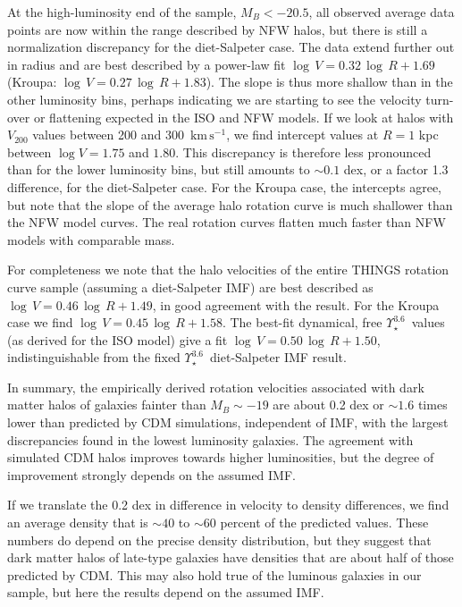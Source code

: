\documentclass[usenatbib,usegraphicx,apjfonts,floatfix]{emulateapj}
\newcommand{\kms}{\ensuremath{\,\mbox{km}\,\mbox{s}^{-1}}}
\newcommand{\Ups}{\ensuremath{\Upsilon_{\star}^{3.6}}}
\begin{document}
At the high-luminosity end of the sample, $M_B < -20.5$, all observed
average data points are now within the range described by NFW halos,
but there is still a normalization discrepancy for the diet-Salpeter
case. The data extend further out in radius and are best described by
a power-law fit $\log\,V = 0.32\, \log\,R + 1.69$ (Kroupa: $\log\,V =
0.27\, \log\,R + 1.83$). The slope is thus more shallow than in the
other luminosity bins, perhaps indicating we are starting to see the
velocity turn-over or flattening expected in the ISO and NFW models.
If we look at halos with $V_{200}$ values between 200 and 300 \kms, we
find intercept values at $R=1$ kpc between $\log V = 1.75$ and
$1.80$. This discrepancy is therefore less pronounced than for the
lower luminosity bins, but still amounts to $\sim 0.1$ dex, or a
factor 1.3 difference, for the diet-Salpeter case.  For the Kroupa
case, the intercepts agree, but note that the slope of the average
halo rotation curve is much shallower than the NFW model curves. The
real rotation curves flatten much faster than NFW models with
comparable mass.

For completeness we note that the halo velocities of the entire THINGS
rotation curve sample (assuming a diet-Salpeter IMF) are best
described as $\log\,V = 0.46\, \log\,R + 1.49$, in good agreement with
the \citet{stacy07} result.  For the Kroupa case we find $\log\,V =
0.45\, \log\,R + 1.58$.  The best-fit dynamical, free \Ups\ values (as
derived for the ISO model) give a fit $\log\,V = 0.50\, \log\,R +
1.50$, indistinguishable from the fixed \Ups\ diet-Salpeter IMF
result.

In summary, the empirically derived rotation velocities associated
with dark matter halos of galaxies fainter than $M_B \sim -19$ are
about 0.2 dex or $\sim 1.6$ times lower than predicted by CDM
simulations, independent of IMF, with the largest discrepancies found
in the lowest luminosity galaxies. The agreement with simulated CDM
halos improves towards higher luminosities, but the degree of
improvement strongly depends on the assumed IMF.

If we translate the 0.2 dex in difference in velocity to density
differences, we find an average density that is $\sim 40$ to $\sim 60$
percent of the predicted values. These numbers do depend on the
precise density distribution, but they suggest that dark matter halos
of late-type galaxies have densities that are about half of those
predicted by CDM.  This may also hold true of the luminous galaxies in
our sample, but here the results depend on the assumed IMF.
\end{document}
